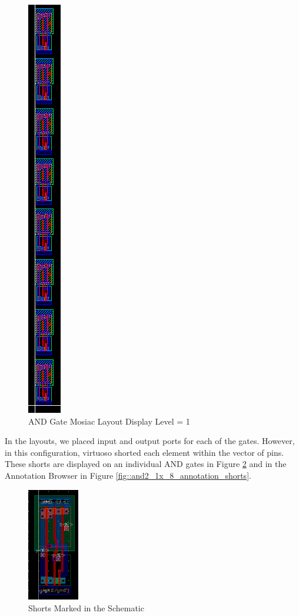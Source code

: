 \documentclass{article}
\begin{document}
	\begin{figure}[H]
		\centerline{\includegraphics[height=0.8\textwidth, angle=270]{and2_1x_8_layout_detailed.png}}
		\caption{AND Gate Mosiac Layout Display Level = 1}
		\label{fig::and2_1x_8_layout_detailed}
	\end{figure}
	
	\noindent In the layouts, we placed input and output ports for each of the gates. However, in this configuration, virtuoso shorted each element within the vector of pins. These shorts are displayed on an individual AND gates in Figure \ref{fig::and2_1x_8_cell_with_shorts} and in the Annotation Browser in Figure \ref{fig::and2_1x_8_annotation_shorts}. 
	
	\begin{figure}[H]
		\centerline{\includegraphics[width=0.2\textwidth]{and2_1x_8_cell_with_shorts.png}}
		\caption{Shorts Marked in the Schematic}
		\label{fig::and2_1x_8_cell_with_shorts}
	\end{figure}
	
\end{document}
